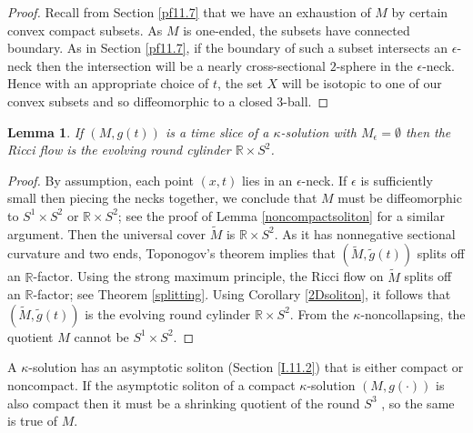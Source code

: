\documentclass[12pt]{amsart}
\newcommand{\R}{{\mathbb R}}
\numberwithin{equation}{section}
\theoremstyle{plain}
\newtheorem{lemma}[equation]{Lemma}
\theoremstyle{definition}
\theoremstyle{remark}
\begin{document}
\begin{proof}
Recall from Section \ref{pf11.7} that we have an exhaustion of
$M$ by certain convex compact subsets.  As $M$ is one-ended, the
subsets have connected boundary.
As in Section \ref{pf11.7}, if the boundary of such a subset intersects an
$\epsilon$-neck then the intersection will be a nearly
cross-sectional $2$-sphere in the $\epsilon$-neck. Hence with
an appropriate choice of $t$, the set $X$ will be isotopic to one
of our convex subsets and so diffeomorphic to a closed $3$-ball.
\end{proof}

\begin{lemma} \label{onlyneck}
If $(M, g(t))$ is a time slice of a $\kappa$-solution with
$M_\epsilon = \emptyset$ then the
Ricci flow is the evolving round cylinder $\R \times S^2$.
\end{lemma}
\begin{proof}
By assumption, each point $(x,t)$ lies in an $\epsilon$-neck. 
If $\epsilon$ is sufficiently small then piecing
the necks together, we conclude that $M$ must be diffeomorphic to
$S^1 \times S^2$ or $\R \times S^2$; see the proof of
Lemma \ref{noncompactsoliton} for a similar argument. Then the universal cover 
$\widetilde{M}$ is
$\R \times S^2$. As it has nonnegative sectional curvature and
two ends, Toponogov's theorem implies that $(\widetilde{M}, 
\widetilde{g}(t))$ splits off
an $\R$-factor. Using the strong maximum principle, the Ricci flow
on $\widetilde{M}$
splits off an $\R$-factor; see Theorem \ref{splitting}.
Using Corollary \ref{2Dsoliton}, it follows that $(\widetilde{M}, 
\widetilde{g}(t))$ is the evolving round cylinder $\R \times S^2$.
From the $\kappa$-noncollapsing, the quotient $M$ cannot be
$S^1 \times S^2$.
\end{proof}

A $\kappa$-solution has an asymptotic soliton
(Section \ref{I.11.2}) that is either compact or noncompact.
If the asymptotic soliton of a compact $\kappa$-solution
$(M, g(\cdot))$ is also compact then it must be a shrinking 
quotient of the round $S^3$ \cite{Hamiltonnnnn}, so the same is true of
$M$.  
\end{document}
